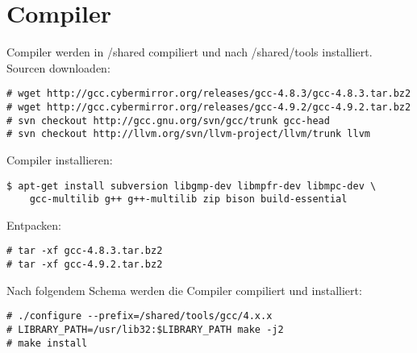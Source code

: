 \chapter{Compiler}
Compiler werden in /shared compiliert und nach /shared/tools installiert.
Sourcen downloaden:
\begin{lstlisting}[style=Bash]
# wget http://gcc.cybermirror.org/releases/gcc-4.8.3/gcc-4.8.3.tar.bz2
# wget http://gcc.cybermirror.org/releases/gcc-4.9.2/gcc-4.9.2.tar.bz2
# svn checkout http://gcc.gnu.org/svn/gcc/trunk gcc-head
# svn checkout http://llvm.org/svn/llvm-project/llvm/trunk llvm
\end{lstlisting}
Compiler installieren:
\begin{lstlisting}[style=Bash]
$ apt-get install subversion libgmp-dev libmpfr-dev libmpc-dev \
	gcc-multilib g++ g++-multilib zip bison build-essential
\end{lstlisting}
Entpacken:
\begin{lstlisting}[style=Bash]
# tar -xf gcc-4.8.3.tar.bz2
# tar -xf gcc-4.9.2.tar.bz2
\end{lstlisting}
Nach folgendem Schema werden die Compiler compiliert und installiert:
\begin{lstlisting}[style=Bash]
# ./configure --prefix=/shared/tools/gcc/4.x.x
# LIBRARY_PATH=/usr/lib32:$LIBRARY_PATH make -j2
# make install
\end{lstlisting}
